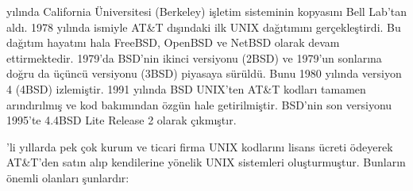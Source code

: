 \documentclass[a4paper,10pt,turkish]{sphinxmanual}
\begin{document}
 yılında California Üniversitesi (Berkeley) işletim sisteminin kopyasını Bell Lab’tan
aldı. 1978 yılında  ismiyle AT\&T dışındaki ilk UNIX
dağıtımını gerçekleştirdi. Bu dağıtım hayatını hala FreeBSD, OpenBSD ve NetBSD olarak
devam ettirmektedir. 1979’da BSD’nin ikinci versiyonu (2BSD) ve 1979’un sonlarına doğru da
üçüncü versiyonu (3BSD) piyasaya sürüldü. Bunu 1980 yılında versiyon 4 (4BSD) izlemiştir.
1991 yılında BSD UNIX’ten AT\&T kodları tamamen arındırılmış ve kod bakımından özgün hale
getirilmiştir. BSD’nin son versiyonu 1995’te 4.4BSD Lite Release 2 olarak çıkmıştır.

’li yıllarda pek çok kurum ve ticari firma UNIX kodlarını lisans ücreti ödeyerek
AT\&T’den satın alıp kendilerine yönelik UNIX sistemleri oluşturmuştur. Bunların önemli
olanları şunlardır:
\end{document}
